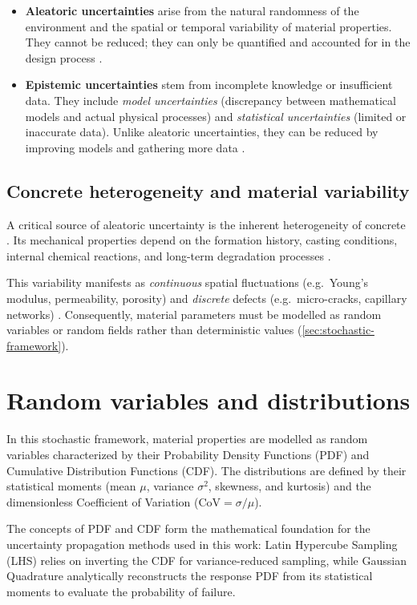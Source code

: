 \begin{itemize}
    \item \textbf{Aleatoric uncertainties} arise from the natural randomness of the environment and the spatial or temporal variability of material properties. They cannot be reduced; they can only be quantified and accounted for in the design process \cite{baroth2023}.

    \item \textbf{Epistemic uncertainties} stem from incomplete knowledge or insufficient data. They include \emph{model uncertainties} (discrepancy between mathematical models and actual physical processes) and \emph{statistical uncertainties} (limited or inaccurate data). Unlike aleatoric uncertainties, they can be reduced by improving models and gathering more data \cite{baroth2023}.
\end{itemize}

\subsection{Concrete heterogeneity and material variability}

A critical source of aleatoric uncertainty is the inherent heterogeneity of concrete \cite{baroth2023,delarrard2010}. Its mechanical properties depend on the formation history, casting conditions, internal chemical reactions, and long-term degradation processes \cite{delarrard2010}.

This variability manifests as \emph{continuous} spatial fluctuations (e.g.\ Young's modulus, permeability, porosity) and \emph{discrete} defects (e.g.\ micro-cracks, capillary networks) \cite{baroth2023}. Consequently, material parameters must be modelled as random variables or random fields rather than deterministic values (\cref{sec:stochastic-framework}).

\section{Random variables and distributions} \label{sec:random-variables}
In this stochastic framework, material properties are modelled as random variables characterized by their Probability Density Functions (PDF) and Cumulative Distribution Functions (CDF). The distributions are defined by their statistical moments (mean $\mu$, variance $\sigma^2$, skewness, and kurtosis) and the dimensionless Coefficient of Variation ($\mathrm{CoV} = \sigma/\mu$).

The concepts of PDF and CDF form the mathematical foundation for the uncertainty propagation methods used in this work: Latin Hypercube Sampling (LHS) relies on inverting the CDF for variance-reduced sampling, while Gaussian Quadrature analytically reconstructs the response PDF from its statistical moments to evaluate the probability of failure.

